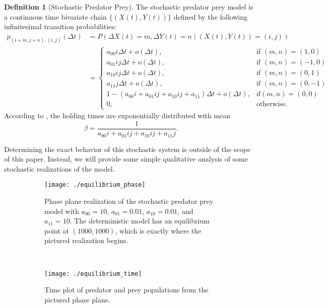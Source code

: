 \documentclass[12pt]{article}
\theoremstyle{definition}
\newtheorem{defn}{Definition}
\begin{document}
\begin{defn}[Stochastic Predator Prey]
    \label{defn:predator-prey}
    The stochastic predator prey model is a continuous time bivariate chain
    $\{(X(t), Y(t))\}$ defined by the following infinitesimal transition
    probabilities:
    \begin{align*}
        p_{(i + m, j + n), (i, j)}(\Delta t) &= P(\Delta X(t) = m, \Delta Y(t) =
        n \mid (X(t), Y(t)) = (i, j)) \\
        &=
        \begin{cases}
            a_{00} i \Delta t + o(\Delta t), & \text{if } (m, n) = (1, 0) \\
            a_{01} ij \Delta t + o(\Delta t), & \text{if } (m, n) = (-1, 0) \\
            a_{10} ij \Delta t + o(\Delta t), & \text{if } (m, n) = (0, 1) \\
            a_{11} j \Delta t + o(\Delta t), & \text{if } (m, n) = (0, -1) \\
            1 - (a_{00}i + a_{01}ij + a_{10} ij + a_{11})\Delta t + o(\Delta
                t), & \text{if} (m, n) = (0, 0) \\
            0, & \text{otherwise.}
        \end{cases}
    \end{align*}
    According to \cite{allen2010introduction}, the holding times are
    exponentially distributed with mean $$\beta = \frac{1}{a_{00}i + a_{01}ij +
    a_{10}ij + a_{11}j}.$$
\end{defn}

Determining the exact behavior of this stochastic system is outside of the
scope of this paper. Instead, we will provide some simple qualitative analysis
of some stochastic realizations of the model.

\begin{figure}[p]
    \centering
    \begin{subfigure}[t]{.5\textwidth}
        \texttt{[image: ./equilibrium\_phase]}
        \caption{Phase plane realization of the stochastic predator prey model
        with $a_{00} = 10$, $a_{01} = 0.01$, $a_{10} = 0.01$, and $a_{11} =
        10$. The deterministic model has an equilibrium point at $(1000,
        1000)$, which is exactly where the pictured realization begins.}
    \end{subfigure}%
    ~~~
    \begin{subfigure}[t]{.5\textwidth}
        \texttt{[image: ./equilibrium\_time]}
        \caption{Time plot of predator and prey populations from the pictured
        phase plane.}
    \end{subfigure}
    \caption{}
    \label{fig:broken-eq-pts}
\end{figure}
\end{document}
